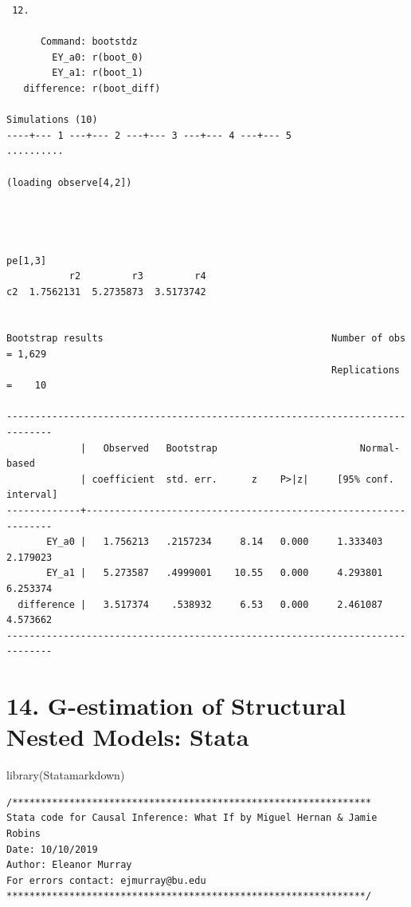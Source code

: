 \documentclass[
  10pt,
]{book}
\newenvironment{Shaded}{\begin{snugshade}}{\end{snugshade}}
\newcommand{\FunctionTok}[1]{\textcolor[rgb]{0.00,0.00,0.00}{#1}}
\newcommand{\NormalTok}[1]{#1}
\begin{document}
\begin{verbatim}
 12. 

      Command: bootstdz
        EY_a0: r(boot_0)
        EY_a1: r(boot_1)
   difference: r(boot_diff)

Simulations (10)
----+--- 1 ---+--- 2 ---+--- 3 ---+--- 4 ---+--- 5 
..........

(loading observe[4,2])




pe[1,3]
           r2         r3         r4
c2  1.7562131  5.2735873  3.5173742


Bootstrap results                                        Number of obs = 1,629
                                                         Replications  =    10

------------------------------------------------------------------------------
             |   Observed   Bootstrap                         Normal-based
             | coefficient  std. err.      z    P>|z|     [95% conf. interval]
-------------+----------------------------------------------------------------
       EY_a0 |   1.756213   .2157234     8.14   0.000     1.333403    2.179023
       EY_a1 |   5.273587   .4999001    10.55   0.000     4.293801    6.253374
  difference |   3.517374    .538932     6.53   0.000     2.461087    4.573662
------------------------------------------------------------------------------
\end{verbatim}

\hypertarget{g-estimation-of-structural-nested-models-stata}{%
\chapter*{14. G-estimation of Structural Nested Models: Stata}\label{g-estimation-of-structural-nested-models-stata}}

\begin{Shaded}
\begin{Highlighting}[]
\FunctionTok{library}\NormalTok{(Statamarkdown)}
\end{Highlighting}
\end{Shaded}

\begin{verbatim}
/***************************************************************
Stata code for Causal Inference: What If by Miguel Hernan & Jamie Robins
Date: 10/10/2019
Author: Eleanor Murray 
For errors contact: ejmurray@bu.edu
***************************************************************/
\end{verbatim}
\end{document}
